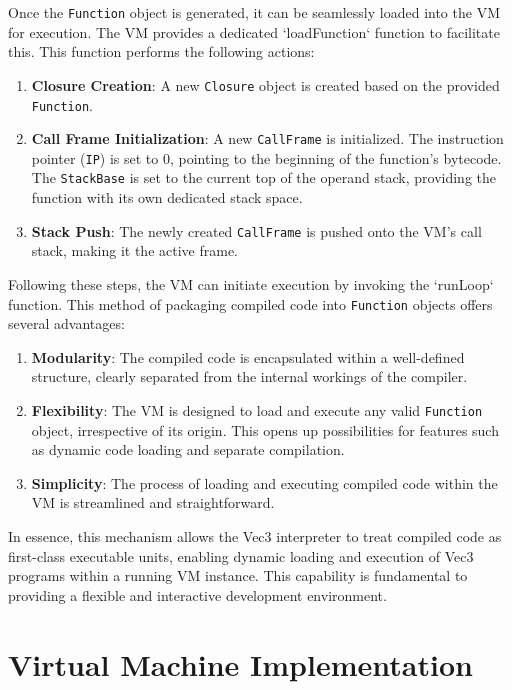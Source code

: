 Once the \texttt{Function} object is generated, it can be seamlessly loaded into the VM for execution. The VM provides a dedicated `loadFunction` function to facilitate this. This function performs the following actions:
\begin{enumerate}
    \item \textbf{Closure Creation}: A new \texttt{Closure} object is created based on the provided \texttt{Function}.
    \item \textbf{Call Frame Initialization}: A new \texttt{CallFrame} is initialized. The instruction pointer (\texttt{IP}) is set to 0, pointing to the beginning of the function's bytecode. The \texttt{StackBase} is set to the current top of the operand stack, providing the function with its own dedicated stack space.
    \item \textbf{Stack Push}: The newly created \texttt{CallFrame} is pushed onto the VM's call stack, making it the active frame.
\end{enumerate}
Following these steps, the VM can initiate execution by invoking the `runLoop` function.
This method of packaging compiled code into \texttt{Function} objects offers several advantages:

\begin{enumerate}
    \item \textbf{Modularity}: The compiled code is encapsulated within a well-defined structure, clearly separated from the internal workings of the compiler.
    \item \textbf{Flexibility}: The VM is designed to load and execute any valid \texttt{Function} object, irrespective of its origin. This opens up possibilities for features such as dynamic code loading and separate compilation.
    \item \textbf{Simplicity}: The process of loading and executing compiled code within the VM is streamlined and straightforward.
\end{enumerate}
In essence, this mechanism allows the Vec3 interpreter to treat compiled code as first-class executable units, enabling dynamic loading and execution of Vec3 programs within a running VM instance. This capability is fundamental to providing a flexible and interactive development environment.

\section{Virtual Machine Implementation}
\label{sec:virtual-machine}

